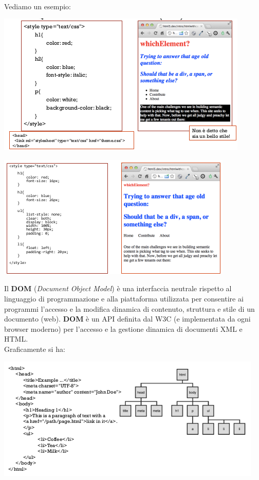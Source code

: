 \documentclass[a4paper,12pt, oneside]{book}
\begin{document}
\\Vediamo un esempio:
\begin{center}
	\includegraphics[scale=0.9]{img/css.png}
\end{center}
\begin{center}
	\includegraphics[scale=0.9]{img/css2.png}
\end{center}
Il \textbf{DOM} (\textit{Document Object Model}) è una interfaccia neutrale rispetto al linguaggio di programmazione e alla piattaforma utilizzata per consentire ai programmi l'accesso e la modifica dinamica di contenuto, struttura e stile di un documento (web). \textbf{DOM} è un API definita dal W3C (e implementata da ogni browser moderno) per l'accesso e la gestione dinamica di documenti XML e HTML.\\
Graficamente si ha:
\begin{center}
	\includegraphics[scale=0.9]{img/dom.png}
\end{center}
\end{document}
